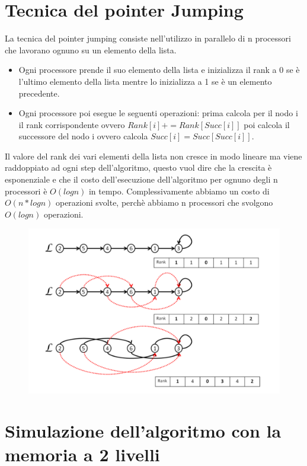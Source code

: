 \documentclass[14pt]{extreport}
\begin{document}
\section{Tecnica del pointer Jumping}

La tecnica del pointer jumping consiste nell'utilizzo in parallelo di n processori che lavorano ognuno su un elemento della lista.
\begin{itemize}
    \item Ogni processore prende il suo elemento della lista e inizializza il rank a 0 se è l'ultimo elemento della lista mentre lo inizializza a 1 se è un elemento precedente.
    \item Ogni processore poi esegue le seguenti operazioni: prima calcola per il nodo i il rank corrispondente ovvero $Rank[i] += Rank[Succ[i]]$ poi calcola il successore del nodo i ovvero calcola $Succ[i] = Succ[Succ[i]]$.
\end{itemize}

Il valore del rank dei vari elementi della lista non cresce in modo lineare ma viene raddoppiato ad ogni step dell'algoritmo, questo vuol dire che la crescita è esponenziale e che il costo dell'esecuzione dell'algoritmo per ognuno degli n processori è $O(logn)$ in tempo. Complessivamente abbiamo un costo di $O(n*logn)$ operazioni svolte, perchè abbiamo n processori che svolgono $O(log n)$ operazioni.

\begin{figure}[h!]
  \centering
  \includegraphics[width=\linewidth]{PointerJumping.png}
  
\end{figure}

\section{Simulazione dell'algoritmo con la memoria a 2 livelli}
\end{document}
